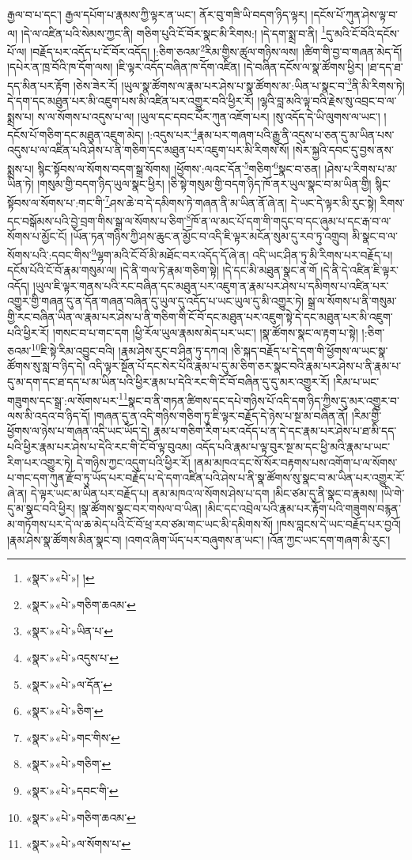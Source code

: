 རྒྱལ་བ་པ་དང་། རྒྱལ་དཔོག་པ་རྣམས་ཀྱི་ལྟར་ན་ཡང་། ནོར་བུ་གཟི་ཡི་བདག་ཉིད་ལྟར། །དངོས་པོ་ཀུན་ཤེས་ལྟ་བ་ལ། །དེ་ལ་འཛིན་པའི་སེམས་ཀྱང་ནི། གཅིག་པུའི་ངོ་བོར་སྣང་མི་རིགས:། །དེ་དག་སྨྲ་བ་ནི། \footnote{«སྣར་»«པེ་»། ། }དུ་མའི་ངོ་བོའི་དངོས་པོ་ལ། །བརྗོད་པར་འདོད་པ་ངོ་བོར་འདོད། །:ཅིག་ཅའམ་\footnote{«སྣར་»«པེ་»གཅིག་ཆའམ་}རིམ་གྱིས་ཚུལ་གཉིས་ལས། །ཚིག་གི་བྱ་བ་གཞན་མེད་དོ། །དཔེར་ན་ཁྲ་བོའི་ཁ་དོག་ལས། །ཇི་ལྟར་འདོད་བཞིན་ཁ་དོག་འཛིན། །དེ་བཞིན་དངོས་ལ་སྣ་ཚོགས་ཕྱིར། །ཐ་དད་ཐ་དད་མིན་པར་རྟོག །ཅེས་ཟེར་རོ། །ཡུལ་སྣ་ཚོགས་ལ་རྣམ་པར་ཤེས་པ་སྣ་ཚོགས་མ་:ཡིན་པ་སྣང་བ་\footnote{«སྣར་»«པེ་»ཡིན་པ་}ནི་མི་རིགས་ཏེ། དེ་དག་དང་མཐུན་པར་མི་འཇུག་པས་མི་འཛིན་པར་འགྱུར་བའི་ཕྱིར་རོ། །ལྷའི་བླ་མའི་ལྟ་བའི་རྗེས་སུ་འབྲང་བ་ལ་སྨྲས་པ། ས་ལ་སོགས་པ་འདུས་པ་ལ། །ཡུལ་དང་དབང་པོར་ཀུན་འཇོག་པར། །སུ་འདོད་དེ་ཡི་ལུགས་ལ་ཡང་། །དངོས་པོ་གཅིག་དང་མཐུན་འཇུག་མེད། །:འདུས་པར་\footnote{«སྣར་»«པེ་»འདུས་པ་}རྣམ་པར་གཞག་པའི་རྒྱུ་ནི་འདུས་པ་ཅན་དུ་མ་ཡིན་པས་འདུས་པ་ལ་འཛིན་པའི་ཤེས་པ་ནི་གཅིག་དང་མཐུན་པར་འཇུག་པར་མི་རིགས་སོ། །སེར་སྐྱའི་དབང་དུ་བྱས་ནས་སྨྲས་པ། སྙིང་སྟོབས་ལ་སོགས་བདག་སྒྲ་སོགས། །ཕྱོགས་:ལའང་དོན་\footnote{«སྣར་»«པེ་»ལ་དོན་}གཅིག་\footnote{«སྣར་»«པེ་»ཅིག་}སྣང་བ་ཅན། །ཤེས་པ་རིགས་པ་མ་ཡིན་ཏེ། །གསུམ་གྱི་བདག་ཉིད་ཡུལ་སྣང་ཕྱིར། །ཅི་སྟེ་གསུམ་གྱི་བདག་ཉིད་ཁོ་ནར་ཡུལ་སྣང་བ་མ་ཡིན་གྱི། སྙིང་སྟོབས་ལ་སོགས་པ་:གང་གི་\footnote{«སྣར་»«པེ་»གང་གིས་}ཤས་ཆེ་བ་དེ་དམིགས་ཏེ་གཞན་ནི་མ་ཡིན་ནོ་ཞེ་ན། དེ་ཡང་དེ་ལྟར་མི་རུང་སྟེ། རིགས་དང་བསྒོམས་པའི་བྱེ་བྲག་གིས་སྒྲ་ལ་སོགས་པ་ཅིག་\footnote{«སྣར་»«པེ་»གཅིག་}ཁོ་ན་ལ་མང་པོ་དག་གི་གདུང་བ་དང་ཞུམ་པ་དང་རྒ་བ་ལ་སོགས་པ་མྱོང་ངོ། །ཡོན་ཏན་གཉིས་ཀྱི་ཤས་ཆུང་ན་མྱོང་བ་འདི་ཇི་ལྟར་མངོན་སུམ་དུ་རབ་ཏུ་འགྲུབ། མི་སྣང་བ་ལ་སོགས་པའི་:དབང་གིས་\footnote{«སྣར་»«པེ་»དབང་གི་}ལྷག་མའི་ངོ་བོ་མི་མཐོང་བར་འདོད་དོ་ཞེ་ན། འདི་ཡང་ཤིན་ཏུ་མི་རིགས་པར་བརྗོད་པ། དངོས་པོའི་ངོ་བོ་རྣམ་གསུམ་ལ། །དེ་ནི་གལ་ཏེ་རྣམ་གཅིག་སྟེ། །དེ་དང་མི་མཐུན་སྣང་ན་གོ །དེ་ནི་དེ་འཛིན་ཇི་ལྟར་འདོད། །ཡུལ་ཇི་ལྟར་གནས་པའི་རང་བཞིན་དང་མཐུན་པར་འཇུག་ན་རྣམ་པར་ཤེས་པ་དམིགས་པ་འཛིན་པར་འགྱུར་གྱི་གཞན་དུ་ན་དོན་གཞན་བཞིན་དུ་ཡུལ་དུ་འདོད་པ་ཡང་ཡུལ་དུ་མི་འགྱུར་ཏེ། སྒྲ་ལ་སོགས་པ་ནི་གསུམ་གྱི་རང་བཞིན་ཡིན་ལ་རྣམ་པར་ཤེས་པ་ནི་གཅིག་གི་ངོ་བོ་དང་མཐུན་པར་འཇུག་སྟེ་དེ་དང་མཐུན་པར་མི་འཇུག་པའི་ཕྱིར་རོ། །གསང་བ་པ་གང་དག །ཕྱི་རོལ་ཡུལ་རྣམས་མེད་པར་ཡང་། །སྣ་ཚོགས་སྣང་ལ་རྟག་པ་སྟེ། །:ཅིག་ཅའམ་\footnote{«སྣར་»«པེ་»གཅིག་ཆའམ་}ཇི་སྟེ་རིམ་འབྱུང་བའི། །རྣམ་ཤེས་རུང་བ་ཤིན་ཏུ་དཀའ། །ཅི་སྐད་བརྗོད་པ་དེ་དག་གི་ཕྱོགས་ལ་ཡང་སྣ་ཚོགས་སུ་སླ་བ་ཉིད་དེ། འདི་ལྟར་སྔོན་པོ་དང་སེར་པོའི་རྣམ་པ་དུ་མ་ཅིག་ཅར་སྣང་བའི་རྣམ་པར་ཤེས་པ་ནི་རྣམ་པ་དུ་མ་དག་དང་ཐ་དད་པ་མ་ཡིན་པའི་ཕྱིར་རྣམ་པ་དེའི་རང་གི་ངོ་བོ་བཞིན་དུ་དུ་མར་འགྱུར་རོ། །རིམ་པ་ཡང་གཟུགས་དང་སྒྲ་:ལ་སོགས་པར་\footnote{«སྣར་»«པེ་»ལ་སོགས་པ་}སྣང་བ་ནི་གཏན་ཚིགས་དང་དཔེ་གཉིས་པོ་འདི་དག་ཉིད་ཀྱིས་དུ་མར་འགྱུར་བ་ལས་མི་འདའ་བ་ཉིད་དོ། །གཞན་དུ་ན་འདི་གཉིས་གཅིག་ཏུ་ཇི་ལྟར་བརྗོད་དེ་ཉེས་པ་སྔ་མ་བཞིན་ནོ། །རིམ་གྱི་ཕྱོགས་ལ་ཉེས་པ་གཞན་འདི་ཡང་ཡོད་དེ། རྣམ་པ་གཅིག་རིག་པར་འདོད་པ་ན་དེ་དང་རྣམ་པར་ཤེས་པ་ཐ་མི་དད་པའི་ཕྱིར་རྣམ་པར་ཤེས་པ་དེའི་རང་གི་ངོ་བོ་ལྟ་བུའམ། འདོད་པའི་རྣམ་པ་ལྟ་བུར་སྔ་མ་དང་ཕྱི་མའི་རྣམ་པ་ཡང་རིག་པར་འགྱུར་ཏེ། དེ་གཉིས་ཀྱང་འདུག་པའི་ཕྱིར་རོ། །ནམ་མཁའ་དང་སོ་སོར་བརྟགས་པས་འགོག་པ་ལ་སོགས་པ་གང་དག་ཀུན་རྫོབ་ཏུ་ཡོད་པར་བརྗོད་པ་དེ་དག་འཛིན་པའི་ཤེས་པ་ནི་སྣ་ཚོགས་སུ་སྣང་བ་མ་ཡིན་པར་འགྱུར་རོ་ཞེ་ན། དེ་ལྟར་ཡང་མ་ཡིན་པར་བརྗོད་པ། ནམ་མཁའ་ལ་སོགས་ཤེས་པ་དག །མིང་ཙམ་དུ་ནི་སྣང་བ་རྣམས། །ཡི་གེ་དུ་མ་སྣང་བའི་ཕྱིར། །སྣ་ཚོགས་སྣང་བར་གསལ་བ་ཡིན། །མིང་དང་འབྲེལ་པའི་རྣམ་པར་རྟོག་པའི་གཟུགས་བརྙན་མ་གཏོགས་པར་དེ་ལ་ཆ་མེད་པའི་ངོ་བོ་ཕྲ་རབ་ཙམ་གང་ཡང་མི་དམིགས་སོ། །ཁས་བླངས་དེ་ཡང་བརྗོད་པར་བྱའོ། །རྣམ་ཤེས་སྣ་ཚོགས་མིན་སྣང་བ། །འགའ་ཞིག་ཡོད་པར་བཞུགས་ན་ཡང་། །འོན་ཀྱང་ཡང་དག་གཞག་མི་རུང་། 